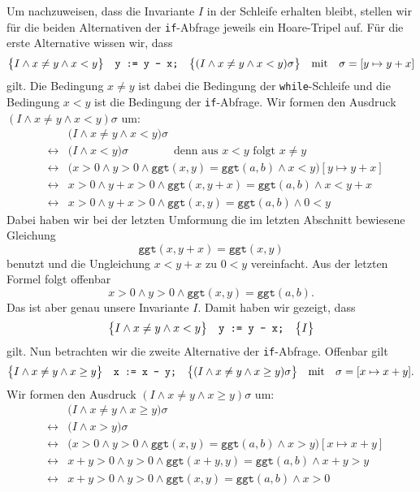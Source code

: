 Um nachzuweisen, dass die Invariante $I$ in der Schleife erhalten bleibt, stellen wir f\"ur
die beiden Alternativen der \texttt{if}-Abfrage jeweils ein Hoare-Tripel auf.  F\"ur die
erste Alternative wissen wir, dass
\[
  \bigl\{I \wedge x \not= y \wedge x < y\bigr\}\quad\texttt{y := y - x;}\quad\bigl\{(I \wedge x \not= y \wedge x < y)\sigma\bigr\} 
  \quad \mathrm{mit} \quad \sigma = [y \mapsto y + x]
\]
gilt.  Die Bedingung $x \not= y$ ist dabei die Bedingung der \texttt{while}-Schleife
und die Bedingung $x < y$ ist die Bedingung der \texttt{if}-Abfrage.
Wir formen den Ausdruck $(I \wedge x \not= y \wedge x < y)\sigma$ um:
\begin{eqnarray*}
 &                 & \bigl(I \wedge x \not= y \wedge x < y\bigr)\sigma \\
 & \leftrightarrow & \bigl(I \wedge x < y\bigr)\sigma 
                     \qquad\qquad \mbox{denn aus $x < y$ folgt $x \not= y$} \\
 & \leftrightarrow & \bigl(x > 0 \wedge y > 0 \wedge \texttt{ggt}(x,y) = \texttt{ggt}(a,b) \wedge 
                     x < y\bigr)[y \mapsto y + x] \\
 & \leftrightarrow & x > 0 \wedge y + x > 0 \wedge \texttt{ggt}(x,y+x) = \texttt{ggt}(a,b)
                     \wedge x < y + x \\
 & \leftrightarrow & x > 0 \wedge y + x > 0 \wedge \texttt{ggt}(x,y) = \texttt{ggt}(a,b) \wedge 0 < y
\end{eqnarray*}
Dabei haben wir bei der letzten Umformung die im letzten Abschnitt bewiesene Gleichung
\[ \texttt{ggt}(x,y+x) = \texttt{ggt}(x,y) \]
benutzt und die Ungleichung $x < y + x$ zu $0 < y$ vereinfacht.
Aus der letzten Formel folgt offenbar
\[ x > 0 \wedge y > 0 \wedge \texttt{ggt}(x,y) = \texttt{ggt}(a,b). \]
Das ist aber genau unsere Invariante $I$.  Damit haben wir gezeigt, dass
\begin{equation}
  \label{eq:if1}
  \bigl\{I \wedge x \not= y \wedge x < y\bigr\}\quad\texttt{y := y - x;}\quad\bigl\{I\bigr\}
\end{equation}
gilt.  Nun betrachten wir die zweite Alternative der \texttt{if}-Abfrage.  Offenbar gilt
\[
  \bigl\{I \wedge x \not= y \wedge x \geq y\bigr\}\quad\texttt{x := x - y;}\quad\bigl\{(I \wedge x \not= y \wedge x \geq y)\sigma\bigr\} 
  \quad \mathrm{mit} \quad \sigma = [x \mapsto x + y].
\]
Wir formen den Ausdruck $(I \wedge x \not= y \wedge x \geq y)\sigma$ um:
\begin{eqnarray*}
 &   & \bigl(I \wedge x \not= y \wedge x \geq y\bigr)\sigma \\
 & \leftrightarrow & \bigl(I \wedge x > y \bigr)\sigma \\
 & \leftrightarrow & \bigl(x > 0 \wedge y > 0 \wedge \texttt{ggt}(x,y) = \texttt{ggt}(a,b) \wedge 
             x > y \bigr)[x \mapsto x + y] \\
 & \leftrightarrow & x + y > 0 \wedge y > 0 \wedge \texttt{ggt}(x+y,y) = \texttt{ggt}(a,b) 
       \wedge x + y > y  \\
 & \leftrightarrow & x + y > 0 \wedge y > 0 \wedge \texttt{ggt}(x,y) = \texttt{ggt}(a,b) 
       \wedge x > 0 
\end{eqnarray*}
